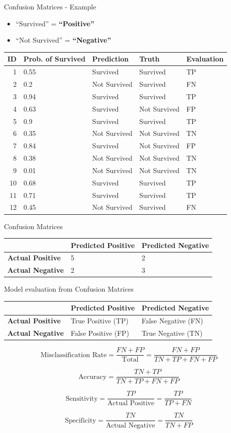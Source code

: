 \documentclass[
  ignorenonframetext,
]{beamer}
\providecommand{\tightlist}{%
  \setlength{\itemsep}{0pt}\setlength{\parskip}{0pt}}
\begin{document}
\begin{frame}{Confusion Matrices - Example}
\protect\hypertarget{confusion-matrices---example}{}

\begin{itemize}
\tightlist
\item
  ``Survived'' = \textbf{``Positive''}
\item
  ``Not Survived'' = \textbf{``Negative''}
\end{itemize}

\begin{longtable}[]{@{}rllll@{}}
\toprule
ID & Prob. of Survived & Prediction & Truth & Evaluation\tabularnewline
\midrule
\endhead
1 & 0.55 & Survived & Survived & TP\tabularnewline
2 & 0.2 & Not Survived & Survived & FN\tabularnewline
3 & 0.94 & Survived & Survived & TP\tabularnewline
4 & 0.63 & Survived & Not Survived & FP\tabularnewline
5 & 0.9 & Survived & Survived & TP\tabularnewline
6 & 0.35 & Not Survived & Not Survived & TN\tabularnewline
7 & 0.84 & Survived & Not Survived & FP\tabularnewline
8 & 0.38 & Not Survived & Not Survived & TN\tabularnewline
9 & 0.01 & Not Survived & Not Survived & TN\tabularnewline
10 & 0.68 & Survived & Survived & TP\tabularnewline
11 & 0.71 & Survived & Survived & TP\tabularnewline
12 & 0.45 & Not Survived & Survived & FN\tabularnewline
\bottomrule
\end{longtable}

\end{frame}

\begin{frame}{Confusion Matrices}
\protect\hypertarget{confusion-matrices-2}{}

\begin{longtable}[]{@{}lll@{}}
\toprule
& Predicted Positive & Predicted Negative\tabularnewline
\midrule
\endhead
\textbf{Actual Positive} & 5 & 2\tabularnewline
\textbf{Actual Negative} & 2 & 3\tabularnewline
\bottomrule
\end{longtable}

\end{frame}

\begin{frame}{Model evaluation from Confusion Matrices}
\protect\hypertarget{model-evaluation-from-confusion-matrices}{}

\begin{longtable}[]{@{}lll@{}}
\toprule
& Predicted Positive & Predicted Negative\tabularnewline
\midrule
\endhead
\textbf{Actual Positive} & True Positive (TP) & False Negative
(FN)\tabularnewline
\textbf{Actual Negative} & False Positive (FP) & True Negative
(TN)\tabularnewline
\bottomrule
\end{longtable}

\[
\text{Misclassification Rate} =  \frac{FN + FP}{\text{Total}} = \frac{FN + FP}{TN+TP+FN+FP} 
\]

\[
\text{Accuracy} = \frac{TN+TP}{TN+TP+FN+FP} 
\]

\[
\text{Sensitivity} = \frac{TP}{\text{Actual Positive}} = \frac{TP}{TP+FN} 
\]

\[
\text{Specificity} = \frac{TN}{\text{Actual Negative}} = \frac{TN}{TN+FP}
\]

\end{frame}
\end{document}
